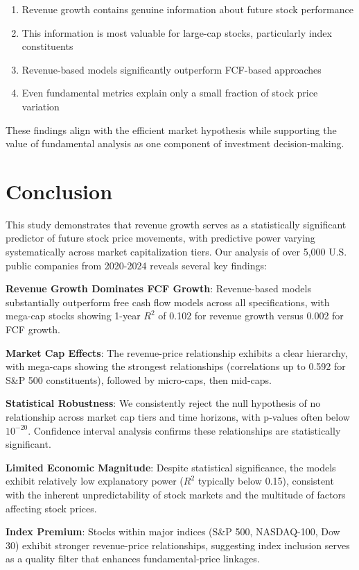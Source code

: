 \documentclass[11pt]{article}
\begin{document}
\begin{enumerate}
\item Revenue growth contains genuine information about future stock performance
\item This information is most valuable for large-cap stocks, particularly index constituents  
\item Revenue-based models significantly outperform FCF-based approaches
\item Even fundamental metrics explain only a small fraction of stock price variation
\end{enumerate}

These findings align with the efficient market hypothesis while supporting the value of fundamental analysis as one component of investment decision-making.

\section{Conclusion}

This study demonstrates that revenue growth serves as a statistically significant predictor of future stock price movements, with predictive power varying systematically across market capitalization tiers. Our analysis of over 5,000 U.S. public companies from 2020-2024 reveals several key findings:

\textbf{Revenue Growth Dominates FCF Growth}: Revenue-based models substantially outperform free cash flow models across all specifications, with mega-cap stocks showing 1-year $R^2$ of 0.102 for revenue growth versus 0.002 for FCF growth.

\textbf{Market Cap Effects}: The revenue-price relationship exhibits a clear hierarchy, with mega-caps showing the strongest relationships (correlations up to 0.592 for S\&P 500 constituents), followed by micro-caps, then mid-caps.

\textbf{Statistical Robustness}: We consistently reject the null hypothesis of no relationship across market cap tiers and time horizons, with p-values often below $10^{-20}$. Confidence interval analysis confirms these relationships are statistically significant.

\textbf{Limited Economic Magnitude}: Despite statistical significance, the models exhibit relatively low explanatory power ($R^2$ typically below 0.15), consistent with the inherent unpredictability of stock markets and the multitude of factors affecting stock prices.

\textbf{Index Premium}: Stocks within major indices (S\&P 500, NASDAQ-100, Dow 30) exhibit stronger revenue-price relationships, suggesting index inclusion serves as a quality filter that enhances fundamental-price linkages.
\end{document}
